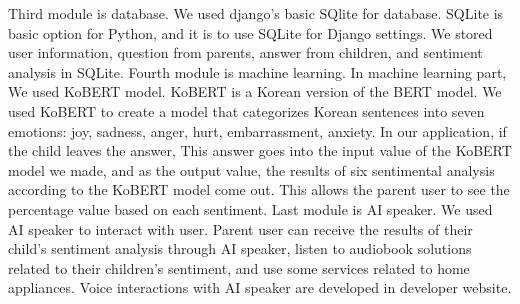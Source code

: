 \documentclass[conference]{IEEEtran}
\begin{document}
Third  module is database. We used django’s basic SQlite for database. SQLite is basic option for Python, and it is to use SQLite for Django settings. We stored user information, question from parents, answer from children, and sentiment analysis in SQLite. Fourth module is machine learning. In machine learning part, We used KoBERT model. KoBERT is a Korean version of the BERT model. We used KoBERT to create a model that categorizes Korean sentences into seven emotions: joy, sadness, anger, hurt, embarrassment, anxiety. In our application, if the child leaves the answer, This answer goes into the input value of the KoBERT model we made, and as the output value, the results of six sentimental analysis according to the KoBERT model come out. This allows the parent user to see the percentage value based on each sentiment. Last module is AI speaker. We used AI speaker to interact with user. Parent user can receive the results of their child's sentiment analysis through AI speaker, listen to audiobook solutions related to their children's sentiment, and use some services related to home appliances. Voice interactions with AI speaker are developed in developer website.
\end{document}
